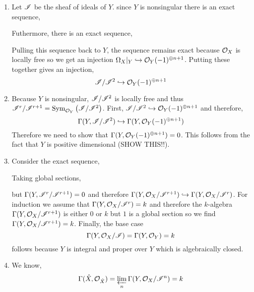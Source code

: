\documentclass[12pt]{article}
\begin{document}
\begin{enumerate}
\item Let $\mathscr{I}$ be the sheaf of ideals of $Y$. since $Y$ is nonsingular there is an exact sequence,
\begin{center}
\end{center}
Futhermore, there is an exact sequence,
\begin{center}
\end{center}
Pulling this sequence back to $Y$, the sequence remains exact because $\mathcal{O}_{X}$ is locally free so we get an injection $\Omega_X |_Y \hookrightarrow \mathcal{O}_{Y}(-1)^{\oplus n + 1}$. Putting these together gives an injection,
\[ \mathscr{I}/\mathscr{I}^2 \hookrightarrow \mathcal{O}_{Y}(-1)^{\oplus n + 1} \]

\item Because $Y$ is nonsingular, $\mathscr{I}/\mathscr{I}^2$ is locally free and thus $\mathscr{I}^r / \mathscr{I}^{r+1} = \mathrm{Sym}_{\mathcal{O}_{Y}}\left( \mathscr{I}/\mathscr{I}^2 \right)$. First, $\mathscr{I} / \mathscr{I}^2 \hookrightarrow \mathcal{O}_{Y}(-1)^{\oplus n + 1}$ and therefore,
\[ \Gamma(Y, \mathscr{I}/\mathscr{I}^2) \hookrightarrow \Gamma(Y, \mathcal{O}_{Y}(-1)^{\oplus n + 1}) \]
Therefore we need to show that $\Gamma(Y, \mathcal{O}_{Y}(-1)^{\oplus n + 1}) = 0$. This follows from the fact that $Y$ is positive dimensional (SHOW THIS!!). 

\item Consider the exact sequence,
\begin{center}
\end{center}
Taking global sections,
\begin{center}
\end{center}
but $\Gamma(Y, \mathscr{I}^r / \mathscr{I}^{r+1}) = 0$ and therefore $\Gamma(Y, \mathcal{O}_{X}/\mathscr{I}^{r+1}) \hookrightarrow \Gamma(Y, \mathcal{O}_{X} / \mathscr{I}^{r})$. For induction we assume that $\Gamma(Y, \mathcal{O}_{X} / \mathscr{I}^{r}) = k$ and therefore the $k$-algebra $\Gamma(Y, \mathcal{O}_{X}/\mathscr{I}^{r+1})$ is either $0$ or $k$ but $1$ is a global section so we find $\Gamma(Y, \mathcal{O}_{X}/\mathscr{I}^{r+1}) = k$. Finally, the base case 
\[ \Gamma(Y, \mathcal{O}_{X}/\mathscr{I}) = \Gamma(Y, \mathcal{O}_{Y}) = k \]
follows because $Y$ is integral and proper over $Y$ which is algebraically closed.

\item We know,
\[ \Gamma(\hat{X}, \mathcal{O}_{\hat{X}}) = \varprojlim_n \Gamma(Y, \mathcal{O}_{X} / \mathscr{I}^n) = k \]
\end{enumerate}
\end{document}
